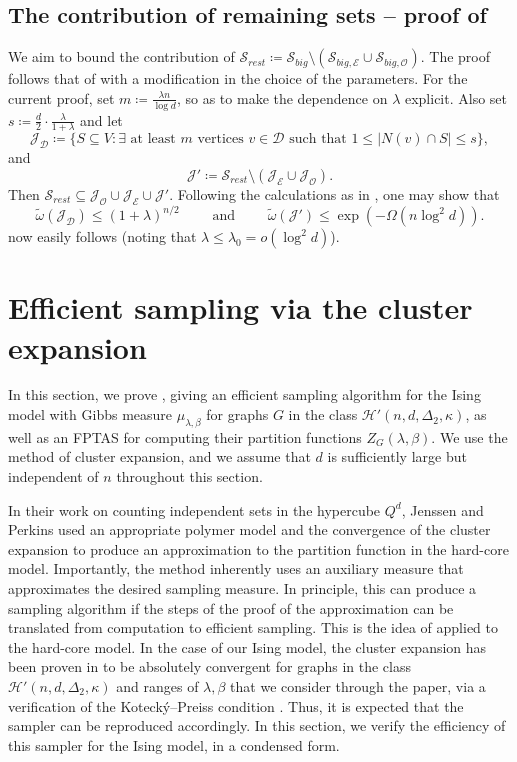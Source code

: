 \documentclass[reqno,a4paper,11pt]{amsart}
\newcommand{\cD}{\mathcal{D}}
\newcommand{\cE}{\mathcal{E}}
\newcommand{\cH}{\mathcal{H}}
\newcommand{\cJ}{\mathcal{J}}
\newcommand{\cO}{\mathcal{O}}
\newcommand{\cS}{\mathcal{S}}
\newcommand{\lam}{\lambda}
\newcommand{\ex}{\kappa}
\newcommand{\codeg}{\Delta_2}
\begin{document}
\subsection{The contribution of remaining sets -- proof of } \label{sec:non-polymer}

We aim to bound the contribution of $\cS_{rest} \coloneqq \cS_{big} \setminus (\cS_{big, \cE} \cup \cS_{big, \cO})$. The proof follows that of \cite[Proof of Lemma 7.1]{GeKaSaWdo25} with a modification in the choice of the parameters. For the current proof, set $m \coloneqq \frac{\lambda n}{\log d}$, so as to make the dependence on $\lambda$ explicit. Also set $s \coloneqq \frac{d}{2} \cdot \frac{\lam}{1+\lam}$ and let
\[
   \cJ_{\cD} \coloneqq\{S \subseteq V : \exists \text{ at least } m \text{ vertices } v \in \cD \text{ such that } 1 \leq |N(v) \cap S| \leq s\},
\]
and
\[
    \cJ' \coloneqq \cS_{rest} \setminus (\cJ_{\cE} \cup \cJ_{\cO}). 
\]
Then $\cS_{rest} \subseteq \cJ_{\cO} \cup \cJ_{\cE} \cup \cJ'$.
Following the calculations as in \cite{GeKaSaWdo25}, one may show that
\[
\tilde{\omega}(\cJ_{\cD}) \leq (1+\lambda)^{n/2} \qquad  \text{ and } \qquad \tilde{\omega}(\cJ')\leq \exp(-\Omega(n \log^2 d)).
\]
 now easily follows (noting that $\lambda \leq \lambda_0=o(\log^2 d)$).

\section{Efficient sampling via the cluster expansion} \label{sec:sampling}

In this section, we prove , giving an efficient sampling algorithm for the Ising model with Gibbs measure $\mu_{\lam,\beta}$ for graphs $G$ in the class $\cH'(n,d,\codeg,\ex)$, as well as an FPTAS for computing their partition functions $Z_G(\lam,\beta)$. We use the method of cluster expansion, and we assume that $d$ is sufficiently large but independent of $n$ throughout this section.

In their work on counting independent sets in the hypercube $Q^d$, Jenssen and Perkins \cite{jenssen2020independent} used an appropriate polymer model and the convergence of the cluster expansion to produce an approximation to the partition function in the hard-core model. Importantly, the method inherently uses an auxiliary measure that approximates the desired sampling measure. In principle, this can produce a sampling algorithm if the steps of the proof of the approximation can be translated from computation to efficient sampling. This is the idea of \cite{JePePo23} applied to the hard-core model. In the case of our Ising model, the cluster expansion has been proven in \cite{GeKaSaWdo25} to be absolutely convergent for graphs in the class $\cH'(n,d,\codeg,\ex)$ and ranges of $\lam,\beta$ that we consider through the paper, via a verification of the Koteck\'y--Preiss condition \cite{kotecky1986cluster}. Thus, it is expected that the sampler can be reproduced accordingly. In this section, we verify the efficiency of this sampler for the Ising model, in a condensed form.
\end{document}
